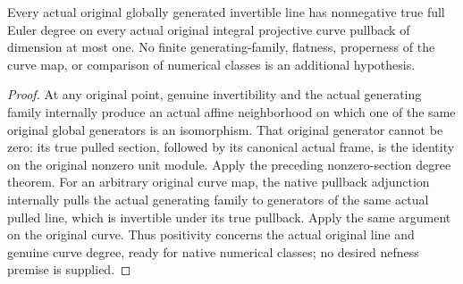 \begin{theorem}
\label{thm:fc-original-global-generators-curve-degree-nonnegative}
\leanok
{}
Every actual original globally generated invertible line has nonnegative
true full Euler degree on every actual original integral projective curve
pullback of dimension at most one.  No finite generating-family, flatness,
properness of the curve map, or comparison of numerical classes is an
additional hypothesis.
\end{theorem}
\begin{proof}
At any original point, genuine invertibility and the actual generating
family internally produce an actual affine neighborhood on which one of
the same original global generators is an isomorphism.  That original
generator cannot be zero: its true pulled section, followed by its
canonical actual frame, is the identity on the original nonzero unit
module.  Apply the preceding nonzero-section degree theorem.  For an
arbitrary original curve map, the native pullback adjunction internally
pulls the actual generating family to generators of the same actual
pulled line, which is invertible under its true pullback.  Apply the same
argument on the original curve.  Thus positivity concerns the actual
original line and genuine curve degree, ready for native numerical
classes; no desired nefness premise is supplied.
\end{proof}
